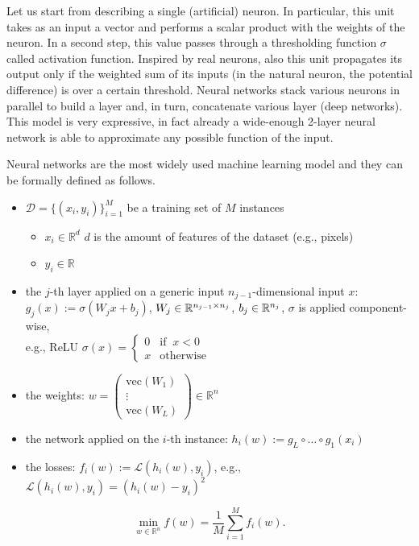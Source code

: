 \documentclass[10pt,a4paper]{article}
\begin{document}
\begin{example} Let us start from describing a single (artificial) neuron. In particular, this unit takes as an input a vector and performs a scalar product with the weights of the neuron. In a second step, this value passes through a thresholding function $\sigma$ called activation function. Inspired by real neurons, also this unit propagates its output only if the weighted sum of its inputs (in the natural neuron, the potential difference)  is over a certain threshold. Neural networks stack various neurons in parallel to build a layer and, in turn, concatenate various layer (deep networks). This model is very expressive, in fact already a wide-enough 2-layer neural network is able to approximate any possible function of the input.
	\par Neural networks are the most widely used machine learning model and they can be formally defined as follows. 
	\begin{itemize}
		\item $\mathcal{D}=\{(x_i, y_i)\}_{i=1}^{M}$ be a training set of $M$ instances
		\begin{itemize}
			\item $x_i \in \mathbb{R}^{d}$ $d$ is the amount of features of the dataset (e.g., pixels)
			\item $y_i\in\mathbb{R}$
		\end{itemize}
		\item the $j$-th layer applied on a generic input $n_{j-1}$-dimensional input $x$:\\
		$g_j(x) := \sigma (W_j x +b_j )$, $W_j \in \mathbb{R}^{n_{j-1}\times n_j}$, $b_j \in \mathbb{R}^{n_j}$, $\sigma$ is applied component-wise,\\ e.g., ReLU $\sigma(x)= \begin{cases} 0 & \text{if} \;\;x<0\\ x &\text{otherwise} \end{cases}$ %
		\item the weights: $w = \begin{pmatrix}
			\text{vec}(W_1)\\
			\vdots\\
			\text{vec}(W_L)
		\end{pmatrix}\in \mathbb{R}^{n}$
		\item the network applied on the $i$-th instance: $h_i(w):=g_L \circ \dots \circ g_1(x_i)$ 
		\item the losses: $f_i(w):=\mathcal{L}(h_i(w),y_i)$, e.g., $\mathcal{L}(h_i(w),y_i)= (h_i(w)-y_i)^2$%
	\end{itemize}
	
	\begin{equation*}
		\min_{w\in \mathbb{R}^n} f(w) = \frac{1}{M}\sum_{i=1}^{M} f_i(w).
	\end{equation*}
\end{example}
\end{document}
